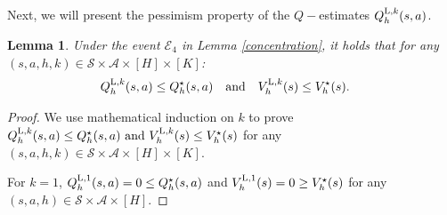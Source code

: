\documentclass{article}
\newtheorem{lemma}{Lemma}[section]
\newcommand{\LL}{\textnormal{L}}
\begin{document}
Next, we will present the pessimism property of the $Q-$estimates $Q_h^{\LL,k}(s,a)$.
\begin{lemma}
\label{QL}
Under the event $\mathcal{E}_4$ in Lemma \ref{concentration}, it holds that for any $(s,a,h,k) \in  \mathcal{S} \times \mathcal{A} \times [H]\times[K]$:
\begin{align*}
    Q_h^{\LL, k}(s, a) &\leq Q_h^\star(s, a) \quad \text{and} \quad V_h^{\LL, k}(s) \leq V_h^\star(s) .
\end{align*}
\end{lemma}
\begin{proof}
     We use mathematical induction on $k$ to prove $Q_h^{\LL, k}(s, a) \leq Q_h^\star(s, a)  \textnormal{ and } V_h^{\LL,k}(s) \leq V_h^\star(s)$ for any $(s,a,h,k) \in \mathcal{S} \times \mathcal{A} \times [H] \times [K]$. 
    
    For $k=1$, $Q_h^{\LL,1}(s,a) = 0 \leq Q_h^{\star}(s,a)$ and $V_h^{\LL,1}(s) = 0 \geq V_h^{\star}(s)$ for any $(s,a,h) \in \mathcal{S} \times \mathcal{A} \times [H]$. 
    

\end{proof}
\end{document}
